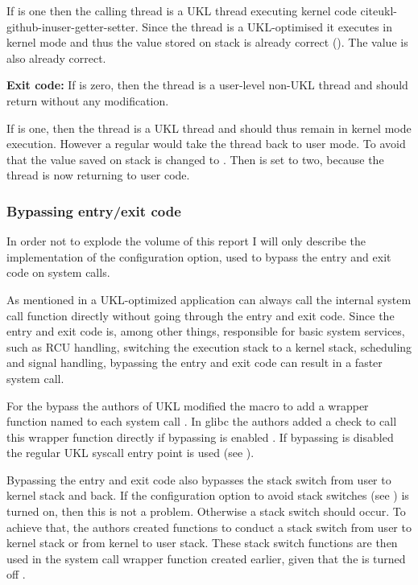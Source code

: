 \documentclass[10pt,twocolumn,a4paper]{article}
\begin{document}
      If  is one then the calling thread is a UKL thread executing 
      kernel code cite{ukl-github-inuser-getter-setter}.
      Since the thread is a UKL-optimised it executes in kernel mode and thus the  value
      stored on stack is already correct ().
      The  value is also already correct.

      \textbf{Exit code:}
      If  is zero, then the thread is a user-level non-UKL thread and should return
      without any modification.

      If  is one, then the thread is a UKL thread and should thus remain in 
      kernel mode execution.
      However a regular  would take the thread back to user mode.
      To avoid that the  value saved on stack is changed to .
      Then  is set to two, because the thread is now returning to user code.

    \subsubsection{Bypassing entry/exit code}
      In order not to explode the volume of this report I will only describe the implementation
      of the  configuration option, used to bypass the entry and exit code
      on system calls.

      As mentioned in  a UKL-optimized application can
      always call the internal system call function directly without going through the entry and
      exit code.
      Since the entry and exit code is, among other things, responsible for basic system services,
      such as RCU handling, switching the execution stack to a kernel stack, scheduling and signal
      handling, bypassing the entry and exit code can result in a faster system call.

      For the bypass the authors of UKL modified the  macro to add
      a wrapper function named  to each system call \cite{ukl-github-bypass}.
      In glibc the authors added a check to call this wrapper function 
      directly if bypassing is enabled \cite{ukl-glibc-bypass}.
      If bypassing is disabled the regular UKL syscall entry point is used (see ).
      
      Bypassing the entry and exit code also bypasses the stack switch from user to kernel stack and back.
      If the configuration option to avoid stack switches (see ) is
      turned on, then this is not a problem.
      Otherwise a stack switch should occur.
      To achieve that, the authors created functions to conduct a stack switch from user to kernel stack 
      or from kernel to user stack.
      These stack switch functions are then used in the system call wrapper function created earlier, 
      given that the  is turned off \cite{ukl-github-bypass}.
\end{document}
